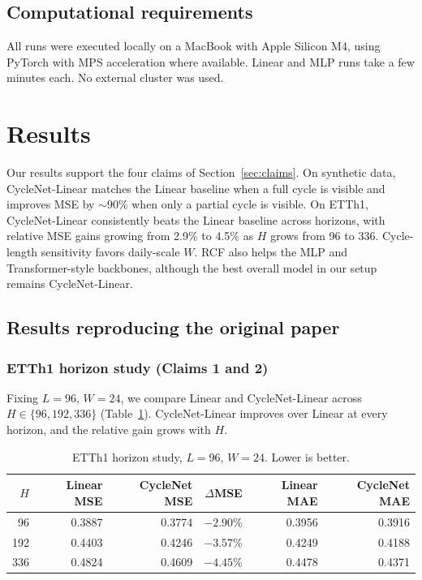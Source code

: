 \documentclass[10pt]{article}
\begin{document}
\subsection{Computational requirements}

All runs were executed locally on a MacBook with Apple Silicon M4, using PyTorch with MPS acceleration where available. Linear and MLP runs take a few minutes each. No external cluster was used.

\section{Results}
\label{sec:results}

Our results support the four claims of Section~\ref{sec:claims}. On synthetic data, CycleNet-Linear matches the Linear baseline when a full cycle is visible and improves MSE by ${\sim}90\%$ when only a partial cycle is visible. On ETTh1, CycleNet-Linear consistently beats the Linear baseline across horizons, with relative MSE gains growing from 2.9\% to 4.5\% as $H$ grows from 96 to 336. Cycle-length sensitivity favors daily-scale $W$. RCF also helps the MLP and Transformer-style backbones, although the best overall model in our setup remains CycleNet-Linear.

\subsection{Results reproducing the original paper}

\subsubsection{ETTh1 horizon study (Claims 1 and 2)}

Fixing $L{=}96$, $W{=}24$, we compare Linear and CycleNet-Linear across $H \in \{96,192,336\}$ (Table~\ref{tab:horizon}). CycleNet-Linear improves over Linear at every horizon, and the relative gain grows with $H$.

\begin{table}[h]
\centering
\caption{ETTh1 horizon study, $L{=}96$, $W{=}24$. Lower is better.}
\label{tab:horizon}
\begin{tabular}{rrrrrr}
\toprule
$H$ & Linear MSE & CycleNet MSE & $\Delta$MSE & Linear MAE & CycleNet MAE \\
\midrule
96  & 0.3887 & 0.3774 & $-2.90\%$ & 0.3956 & 0.3916 \\
192 & 0.4403 & 0.4246 & $-3.57\%$ & 0.4249 & 0.4188 \\
336 & 0.4824 & 0.4609 & $-4.45\%$ & 0.4478 & 0.4371 \\
\bottomrule
\end{tabular}
\end{table}
\end{document}
